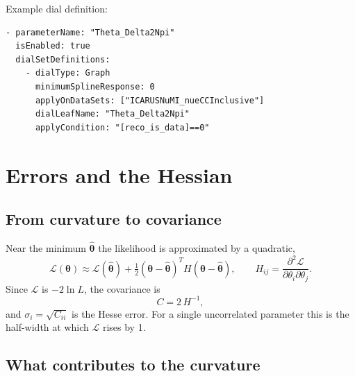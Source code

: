 \documentclass[11pt]{article}
\begin{document}
Example dial definition:
\begin{lstlisting}
- parameterName: "Theta_Delta2Npi"
  isEnabled: true
  dialSetDefinitions:
    - dialType: Graph
      minimumSplineResponse: 0
      applyOnDataSets: ["ICARUSNuMI_nueCCInclusive"]
      dialLeafName: "Theta_Delta2Npi"
      applyCondition: "[reco_is_data]==0"
\end{lstlisting}

\section{Errors and the Hessian}
\label{sec:errors}

\subsection{From curvature to covariance}

Near the minimum $\hat{\boldsymbol\theta}$ the likelihood is approximated by a
quadratic,
\begin{equation}
  \mathcal{L}(\boldsymbol\theta) \approx \mathcal{L}(\hat{\boldsymbol\theta})
  + \tfrac12 (\boldsymbol\theta-\hat{\boldsymbol\theta})^{T} H
    (\boldsymbol\theta-\hat{\boldsymbol\theta}),
  \qquad H_{ij} = \frac{\partial^2\mathcal{L}}{\partial\theta_i\partial\theta_j}.
\end{equation}
Since $\mathcal{L}$ is $-2\ln L$, the covariance is
\begin{equation}
  C = 2\,H^{-1},
\end{equation}
and $\sigma_i = \sqrt{C_{ii}}$ is the Hesse error. For a single uncorrelated
parameter this is the half-width at which $\mathcal{L}$ rises by 1.

\subsection{What contributes to the curvature}
\end{document}
